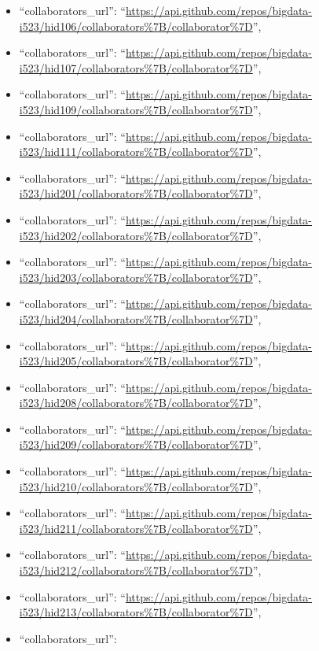 \begin{itemize}
\item
  ``collaborators\_url'':
  ``\url{https://api.github.com/repos/bigdata-i523/hid106/collaborators\%7B/collaborator\%7D}'',
\item
  ``collaborators\_url'':
  ``\url{https://api.github.com/repos/bigdata-i523/hid107/collaborators\%7B/collaborator\%7D}'',
\item
  ``collaborators\_url'':
  ``\url{https://api.github.com/repos/bigdata-i523/hid109/collaborators\%7B/collaborator\%7D}'',
\item
  ``collaborators\_url'':
  ``\url{https://api.github.com/repos/bigdata-i523/hid111/collaborators\%7B/collaborator\%7D}'',
\item
  ``collaborators\_url'':
  ``\url{https://api.github.com/repos/bigdata-i523/hid201/collaborators\%7B/collaborator\%7D}'',
\item
  ``collaborators\_url'':
  ``\url{https://api.github.com/repos/bigdata-i523/hid202/collaborators\%7B/collaborator\%7D}'',
\item
  ``collaborators\_url'':
  ``\url{https://api.github.com/repos/bigdata-i523/hid203/collaborators\%7B/collaborator\%7D}'',
\item
  ``collaborators\_url'':
  ``\url{https://api.github.com/repos/bigdata-i523/hid204/collaborators\%7B/collaborator\%7D}'',
\item
  ``collaborators\_url'':
  ``\url{https://api.github.com/repos/bigdata-i523/hid205/collaborators\%7B/collaborator\%7D}'',
\item
  ``collaborators\_url'':
  ``\url{https://api.github.com/repos/bigdata-i523/hid208/collaborators\%7B/collaborator\%7D}'',
\item
  ``collaborators\_url'':
  ``\url{https://api.github.com/repos/bigdata-i523/hid209/collaborators\%7B/collaborator\%7D}'',
\item
  ``collaborators\_url'':
  ``\url{https://api.github.com/repos/bigdata-i523/hid210/collaborators\%7B/collaborator\%7D}'',
\item
  ``collaborators\_url'':
  ``\url{https://api.github.com/repos/bigdata-i523/hid211/collaborators\%7B/collaborator\%7D}'',
\item
  ``collaborators\_url'':
  ``\url{https://api.github.com/repos/bigdata-i523/hid212/collaborators\%7B/collaborator\%7D}'',
\item
  ``collaborators\_url'':
  ``\url{https://api.github.com/repos/bigdata-i523/hid213/collaborators\%7B/collaborator\%7D}'',
\item
  ``collaborators\_url'':

\end{itemize}
